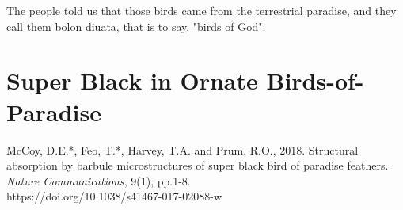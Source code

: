 \begin{savequote}[75mm]
The people told us that those birds came from the terrestrial paradise, and they call them bolon diuata, that is to say, "birds of God".
\end{savequote}

\chapter{Super Black in Ornate Birds-of-Paradise}

\newthought{\textcolor{SchoolColor}{Reprinted from:}}
McCoy, D.E.*, Feo, T.*, Harvey, T.A. and Prum, R.O., 2018. Structural absorption by barbule microstructures of super black bird of paradise feathers. \emph{Nature Communications}, 9(1), pp.1-8.
\\
\newthought{\textcolor{SchoolColor}{Article and supplement available at:}} https://doi.org/10.1038/s41467-017-02088-w 

